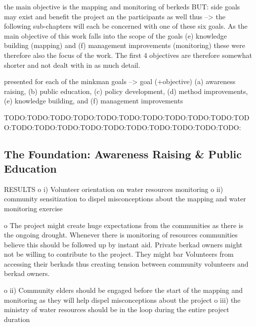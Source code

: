 the main objective is the mapping and monitoring of berkeds BUT: side goals may exist and benefit the project an the participants as well %
thus --> the following sub-chapters will each be concerned with one of these six goals. As the main objective of this work falls into the scope of the goals (e) knowledge building (mapping) and (f) management improvements (monitoring) these were therefore also the focus of the work. The first 4 objectives are therefore somewhat shorter and not dealt with in as much detail. %

presented for each of the minkman goals --> goal (+objective)
(a) awareness raising, (b) public education, (c) policy development, (d) method improvements, (e) knowledge building, and (f) management improvements









TODO:TODO:TODO:TODO:TODO:TODO:TODO:TODO:TODO:TODO:TODO:TODO:TODO:TODO:TODO:TODO:TODO:TODO:TODO:TODO:TODO:
\subsection{The Foundation: Awareness Raising \& Public Education}

RESULTS
o	i) Volunteer orientation on water resources monitoring
o	ii) community sensitization to dispel misconceptions about the mapping and water monitoring exercise

o	The project might create huge expectations from the communities as there is the ongoing drought. Whenever there is monitoring of resources communities believe this should be followed up by instant aid. Private berkad owners might not be willing to contribute to the project. They might bar Volunteers from accessing their berkads thus creating tension between community volunteers and berkad owners.

o	ii) Community elders should be engaged before the start of the mapping and monitoring as they will help dispel misconceptions about the project
o	iii) the ministry of water resources should be in the loop during the entire project duration

